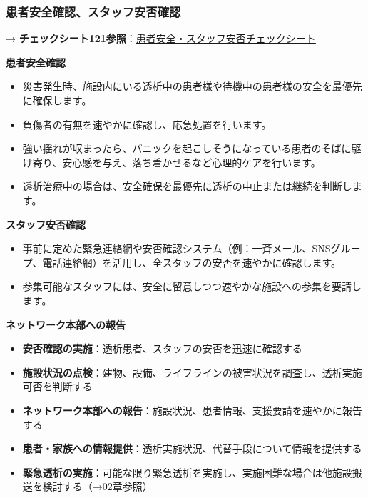 \documentclass[
  japanese,
  letterpaper,
  DIV=11,
  numbers=noendperiod]{scrartcl}
\providecommand{\tightlist}{%
  \setlength{\itemsep}{0pt}\setlength{\parskip}{0pt}}
\begin{document}
\subsubsection{患者安全確認、スタッフ安否確認}\label{ux60a3ux8005ux5b89ux5168ux78baux8a8dux30b9ux30bfux30c3ux30d5ux5b89ux5426ux78baux8a8d}

→
\textbf{チェックシート121参照}：\href{1452_患者安全・スタッフ安否チェックシート.qmd}{患者安全・スタッフ安否チェックシート}

\textbf{患者安全確認}

\begin{itemize}
\tightlist
\item
  災害発生時、施設内にいる透析中の患者様や待機中の患者様の安全を最優先に確保します。
\item
  負傷者の有無を速やかに確認し、応急処置を行います。
\item
  強い揺れが収まったら、パニックを起こしそうになっている患者のそばに駆け寄り、安心感を与え、落ち着かせるなど心理的ケアを行います。
\item
  透析治療中の場合は、安全確保を最優先に透析の中止または継続を判断します。
\end{itemize}

\textbf{スタッフ安否確認}

\begin{itemize}
\tightlist
\item
  事前に定めた緊急連絡網や安否確認システム（例：一斉メール、SNSグループ、電話連絡網）を活用し、全スタッフの安否を速やかに確認します。
\item
  参集可能なスタッフには、安全に留意しつつ速やかな施設への参集を要請します。
\end{itemize}

\textbf{ネットワーク本部への報告}

\begin{itemize}
\tightlist
\item
  \textbf{安否確認の実施}：透析患者、スタッフの安否を迅速に確認する
\item
  \textbf{施設状況の点検}：建物、設備、ライフラインの被害状況を調査し、透析実施可否を判断する
\item
  \textbf{ネットワーク本部への報告}：施設状況、患者情報、支援要請を速やかに報告する
\item
  \textbf{患者・家族への情報提供}：透析実施状況、代替手段について情報を提供する
\item
  \textbf{緊急透析の実施}：可能な限り緊急透析を実施し、実施困難な場合は他施設搬送を検討する（→02章参照）
\end{itemize}
\end{document}
